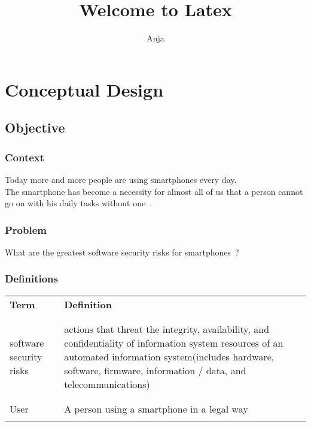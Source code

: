 \documentclass[]{report}
\title{Welcome to Latex}
\author{Anja}
\begin{document}
\maketitle
\tableofcontents %

\newpage %
\chapter{Conceptual Design}
\section{Objective}
\subsection{Context}
Today more and more people are using smartphones every day.\\
The smartphone has become a necessity for almost all of us that a person cannot go on with his daily tasks without one~\parencite{Einstein}.
\subsection{Problem}
What are the greatest software security risks for smartphones~\parencite{Burnette}?

\subsection{Definitions}

\begin{tabular}{l|p{90mm}}
	\\
	\textbf{Term}&\textbf{Definition} \\
	\\
	\hline
	\\
	software security risks&actions that threat the integrity, availability, and confidentiality of information system resources of an automated information   
	system(includes hardware, software, firmware, information / data, and 
	telecommunications)\\
	\\
	\hline
	\\
	User&A person using a smartphone in a legal way\\
	\\
	
\end{tabular}

\newpage
\end{document}
